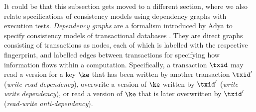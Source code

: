 \ac{It could be that this subsection gets moved to a different section, where 
we also relate specifications of consistency models using dependency graphs
with execution tests.}
\emph{Dependency graphs} are a formalism  introduced by Adya to specify 
consistency models of transactional databases \cite{adya}. They are direct graphs consisting of transactions as nodes, 
each of which is labelled with the respective fingerprint, and labelled edges 
between transactions for specifying how information flows within a computation. 
Specifically, a transaction $\txid$ may read a version for a key $\ke$ that has been written by another transaction $\txid'$ 
(\emph{write-read dependency}), overwrite a version of $\ke$ written by $\txid'$ (\emph{write-write dependency}), or 
read a version of $\ke$ that is later overwritten by $\txid'$ (\emph{read-write anti-dependency}).
